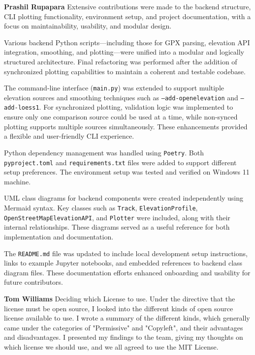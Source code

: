 \documentclass[12pt]{article}
\begin{document}
{\large\textbf{Prashil Rupapara}}
Extensive contributions were made to the backend structure, CLI plotting functionality, environment setup, and project documentation, with a focus on maintainability, usability, and modular design.

Various backend Python scripts—including those for GPX parsing, elevation API integration, smoothing, and plotting—were unified into a modular and logically structured architecture. Final refactoring was performed after the addition of synchronized plotting capabilities to maintain a coherent and testable codebase.

The command-line interface (\texttt{main.py}) was extended to support multiple elevation sources and smoothing techniques such as \texttt{--add-openelevation} and \texttt{--add-loess1}. For synchronized plotting, validation logic was implemented to ensure only one comparison source could be used at a time, while non-synced plotting supports multiple sources simultaneously. These enhancements provided a flexible and user-friendly CLI experience.

Python dependency management was handled using \texttt{Poetry}. Both \texttt{pyproject.toml} and \texttt{requirements.txt} files were added to support different setup preferences. The environment setup was tested and verified on Windows 11 machine.

UML class diagrams for backend components were created independently using Mermaid syntax. Key classes such as \texttt{Track}, \texttt{ElevationProfile}, \texttt{OpenStreetMapElevationAPI}, and \texttt{Plotter}  were included, along with their internal relationships. These diagrams served as a useful reference for both implementation and documentation.

The \texttt{README.md} file was updated to include local development setup instructions, links to example Jupyter notebooks, and embedded references to backend class diagram files. These documentation efforts enhanced onboarding and usability for future contributors.

{\large\textbf{Tom Williams}}
Deciding which License to use.
Under the directive that the license must be open source, I looked into the different kinds of open source license available to use. I wrote a summary of the different kinds, which generally came under the categories of "Permissive" and "Copyleft", and their advantages and disadvantages. I presented my findings to the team, giving my thoughts on which license we should use, and we all agreed to use the MIT License.
\end{document}
